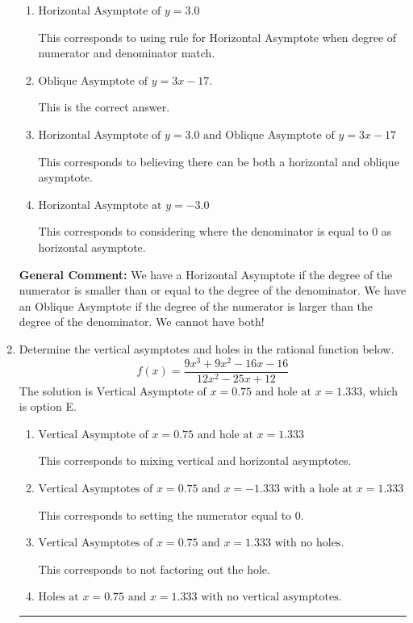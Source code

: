 \documentclass{extbook}[14pt]
\newcommand{\litem}[1]{\item #1

\rule{\textwidth}{0.4pt}}
\begin{document}
\begin{enumerate}
{\begin{enumerate}[label=\Alph*.]
This corresponds to believing there can be both a horizontal and oblique asymptote AND mixing up horizontal/vertical asymoptote.
\item \( \text{Horizontal Asymptote of } y = 3.0  \)

This corresponds to using rule for Horizontal Asymptote when degree of numerator and denominator match.
\item \( \text{Oblique Asymptote of } y = 3x -17. \)

This is the correct answer.
\item \( \text{Horizontal Asymptote of } y = 3.0 \text{ and Oblique Asymptote of } y = 3x -17 \)

This corresponds to believing there can be both a horizontal and oblique asymptote.
\item \( \text{Horizontal Asymptote at } y = -3.0 \)

This corresponds to considering where the denominator is equal to 0 as horizontal asymptote.
\end{enumerate}

\textbf{General Comment:} We have a Horizontal Asymptote if the degree of the numerator is smaller than or equal to the degree of the denominator. We have an Oblique Asymptote if the degree of the numerator is larger than the degree of the denominator. We cannot have both!
}
\litem{
Determine the vertical asymptotes and holes in the rational function below.
\[ f(x) = \frac{9x^{3} +9 x^{2} -16 x -16}{12x^{2} -25 x + 12} \]The solution is \( \text{Vertical Asymptote of } x = 0.75 \text{ and hole at } x = 1.333 \), which is option E.\begin{enumerate}[label=\Alph*.]
\item \( \text{Vertical Asymptote of } x = 0.75 \text{ and hole at } x = 1.333 \)

This corresponds to mixing vertical and horizontal asymptotes.
\item \( \text{Vertical Asymptotes of } x = 0.75 \text{ and } x = -1.333 \text{ with a hole at } x = 1.333 \)

This corresponds to setting the numerator equal to 0.
\item \( \text{Vertical Asymptotes of } x = 0.75 \text{ and } x = 1.333 \text{ with no holes.} \)

This corresponds to not factoring out the hole.
\item \( \text{Holes at } x = 0.75 \text{ and } x = 1.333 \text{ with no vertical asymptotes.} \)


\end{enumerate}}
\end{enumerate}
\end{document}
